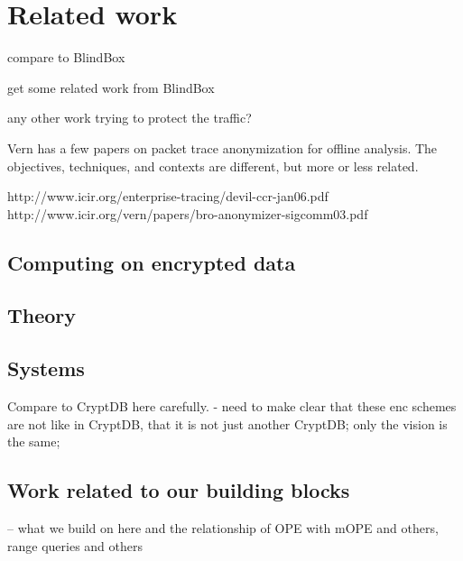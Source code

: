 
\section{Related work}\label{sec:related}

compare to BlindBox

get some related work from BlindBox

any other work trying to protect the traffic? 

Vern has a few papers on packet trace anonymization for offline analysis. The objectives, techniques, and contexts are different, but more or less related.

http://www.icir.org/enterprise-tracing/devil-ccr-jan06.pdf
http://www.icir.org/vern/papers/bro-anonymizer-sigcomm03.pdf



\subsection{Computing on encrypted data}

\subsection{Theory}


\subsection{Systems}

Compare to CryptDB here carefully. 
- need to make clear that these enc schemes are not like in CryptDB, that it is not just another CryptDB; only the vision is the same; %


\subsection{Work related to our building blocks}

-- what we build on here and the relationship of OPE with mOPE and others, range queries and others

